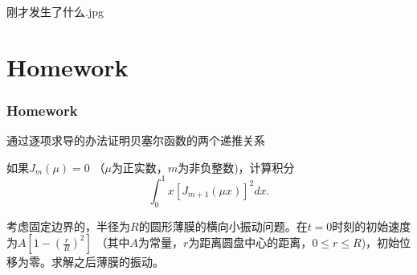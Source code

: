 \documentclass[CJK]{beamer}
\begin{document}
\begin{frame}
  
  \bcenter

  刚才发生了什么.jpg
  \ecenter

\end{frame}


\section{Homework}

\begin{frame}
  \frametitle{Homework}
  
  \bitem
\item{通过逐项求导的办法证明贝塞尔函数的两个递推关系}
\item{如果$J_m(\mu) = 0$ （$\mu$为正实数，$m$为非负整数)，计算积分
    $$\int_0^1x\left[J_{m+1}(\mu x)\right]^2 dx. $$
}
\item{ 考虑固定边界的，半径为$R$的圆形薄膜的横向小振动问题。在$t=0$时刻的初始速度为$A\left[1-\left(\frac{r}{R}\right)^2\right]$ （其中$A$为常量，$r$为距离圆盘中心的距离，$0\le r\le R$)，初始位移为零。求解之后薄膜的振动。
 }
  \eitem
  
\end{frame}

\ech
\end{document}
